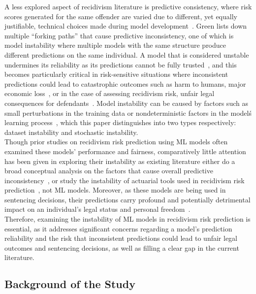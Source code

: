 \documentclass[12pt]{article}
\begin{document}
A less explored aspect of recidivism literature is predictive consistency, where risk scores generated for the same offender are varied due to different, yet equally justifiable, technical choices made during model development~\cite{greene2022forks}. Green lists down multiple ``forking paths'' that cause predictive inconsistency, one of which is model instability where multiple models with the same structure produce different predictions on the same individual. A model that is considered unstable undermines its reliability as its predictions cannot be fully trusted~\cite{riley2023stability}, and this becomes particularly critical in risk-sensitive situations where inconsistent predictions could lead to catastrophic outcomes such as harm to humans, major economic loss~\cite{zhang2024reliability}, or in the case of assessing recidivism risk, unfair legal consequences for defendants~\cite{greene2022forks}. Model instability can be caused by factors such as small perturbations in the training data or nondeterministic factors in the model\'s learning process~\cite{riley2023stability, lopez2022instability}, which this paper distinguishes into two types respectively: dataset instability and stochastic instability.\\

Though prior studies on recidivism risk prediction using ML models often examined these models' performance and fairness, comparatively little attention has been given in exploring their instability as existing literature either do a broad conceptual analysis on the factors that cause overall predictive inconsistency~\cite{greene2022forks}, or study the instability of actuarial tools used in recidivism risk prediction~\cite{helmus2015stability}, not ML models. Moreover, as these models are being used in sentencing decisions, their predictions carry profound and potentially detrimental impact on an individual's legal status and personal freedom~\cite{van2022predicting}.  \\

Therefore, examining the instability of ML models in recidivism risk prediction is essential, as it addresses significant concerns regarding a model's prediction reliability and the risk that inconsistent predictions could lead to unfair legal outcomes and sentencing decisions, as well as filling a clear gap in the current literature.\\
\newpage

\subsection{Background of the Study}
\end{document}
